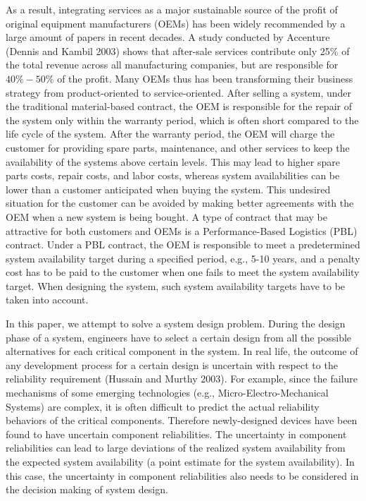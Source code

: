\documentclass[preprint,12pt]{elsarticle}
\begin{document}
As a result, integrating services as a major sustainable source of the profit of original equipment manufacturers (OEMs) has been widely recommended by a large amount of papers in recent decades. A study conducted by Accenture (Dennis and Kambil 2003) shows that after-sale services contribute only 25\% of the total revenue across all manufacturing companies, but are responsible for $40\%-50\%$ of the profit. Many OEMs thus has been transforming their business strategy from product-oriented to service-oriented. After selling a system, under the traditional material-based contract, the OEM is responsible for the repair of the system only within the warranty period, which is often short compared to the life cycle of the system. After the warranty period, the OEM will charge the customer for providing spare parts, maintenance, and other services to keep the availability of the systems above certain levels. This may lead to higher spare parts costs, repair costs, and labor costs, whereas system availabilities can be lower than a customer anticipated when buying the system. This undesired situation for the customer can be avoided by making better agreements with the OEM when a new system is being bought. A type of contract that may be attractive for both customers and OEMs is a Performance-Based Logistics (PBL) contract. Under a PBL contract, the OEM is responsible to meet a predetermined system availability target during a specified period, e.g., 5-10 years, and a penalty cost has to be paid to the customer when one fails to meet the system availability target. When designing the system, such system availability targets have to be taken into account.



In this paper, we attempt to solve a system design problem. During the design phase of a system, engineers have to select a certain design from all the possible alternatives for each critical component in the system. In real life, the outcome of any development process for a certain design is uncertain with respect to the reliability requirement (Hussain and Murthy 2003). For example, since the failure mechanisms of some emerging technologies (e.g., Micro-Electro-Mechanical Systems) are complex, it is often difficult to predict the actual reliability behaviors of the critical components. Therefore newly-designed devices have been found to have uncertain component reliabilities. The uncertainty in component reliabilities can lead to large deviations of the realized system availability from the expected system availability (a point estimate for the system availability). In this case, the uncertainty in component reliabilities also needs to be considered in the decision making of system design.
\end{document}
